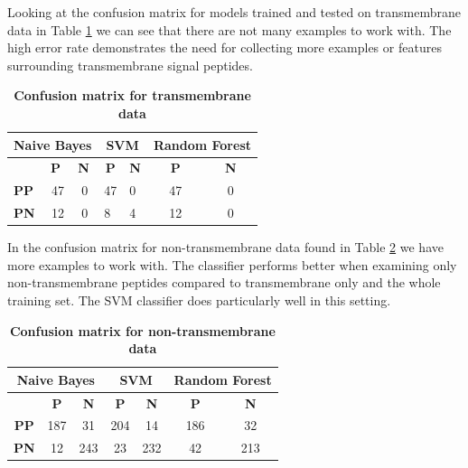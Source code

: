 \documentclass[10pt,letterpaper]{article}
\begin{document}
	Looking at the confusion matrix for models trained and tested on transmembrane data in Table \ref{tab:conf-tm} we can see that there are not many examples to work with. The high error rate demonstrates the need for collecting more examples or features surrounding transmembrane signal peptides.
	\begin{table}[!ht]
		\centering
		\caption{{\bf Confusion matrix for transmembrane data}}
		\label{tab:conf-tm}
		\begin{tabular}{lccllcc}
			\multicolumn{3}{l}{Naive Bayes}                                                & \multicolumn{2}{c}{SVM}                                          & \multicolumn{2}{l}{Random Forest} \\ \hline
			& \multicolumn{1}{l}{\textbf{P}} & \multicolumn{1}{l|}{\textbf{N}} & \multicolumn{1}{c}{\textbf{P}} & \multicolumn{1}{c|}{\textbf{N}} & \textbf{P}      & \textbf{N}      \\ \hline
			\textbf{PP} & 47                             & \multicolumn{1}{c|}{0}          & 47                             & \multicolumn{1}{l|}{0}          & 47              & 0               \\
			\textbf{PN} & 12                             & \multicolumn{1}{c|}{0}          & 8                              & \multicolumn{1}{l|}{4}          & 12              & 0               \\ \hline
		\end{tabular}
	\end{table}

	In the confusion matrix for non-transmembrane data found in Table \ref{tab:conf-non-tm} we have more examples to work with. The classifier performs better when examining only non-transmembrane peptides compared to transmembrane only and the whole training set. The SVM classifier does particularly well in this setting. 
	
	\begin{table}[!ht]
		\centering
		\caption{{\bf Confusion matrix for non-transmembrane data}}
		\label{tab:conf-non-tm}
		\begin{tabular}{ccccccc}
			\multicolumn{3}{c}{Naive Bayes}                            & \multicolumn{2}{c}{SVM}                      & \multicolumn{2}{c}{Random Forest} \\ \hline
			& \textbf{P} & \multicolumn{1}{c|}{\textbf{N}} & \textbf{P} & \multicolumn{1}{c|}{\textbf{N}} & \textbf{P}      & \textbf{N}      \\ \hline
			\textbf{PP} & 187        & \multicolumn{1}{c|}{31}         & 204        & \multicolumn{1}{c|}{14}         & 186             & 32              \\
			\textbf{PN} & 12         & \multicolumn{1}{c|}{243}        & 23         & \multicolumn{1}{c|}{232}        & 42              & 213             \\ \hline
		\end{tabular}
	\end{table}
\end{document}
